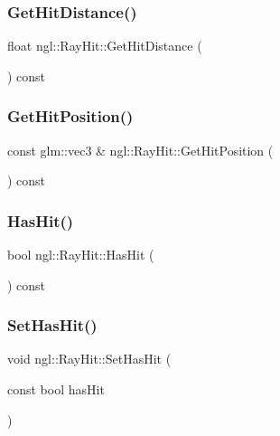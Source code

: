 \subsubsection{\texorpdfstring{Get\+Hit\+Distance()}{GetHitDistance()}}
{\footnotesize\ttfamily float ngl\+::\+Ray\+Hit\+::\+Get\+Hit\+Distance (\begin{DoxyParamCaption}{ }\end{DoxyParamCaption}) const}

\mbox{\label{classngl_1_1_ray_hit_a9e963f543bca4f205409ea9b416e01bc}} 
\subsubsection{\texorpdfstring{Get\+Hit\+Position()}{GetHitPosition()}}
{\footnotesize\ttfamily const glm\+::vec3 \& ngl\+::\+Ray\+Hit\+::\+Get\+Hit\+Position (\begin{DoxyParamCaption}{ }\end{DoxyParamCaption}) const}

\mbox{\label{classngl_1_1_ray_hit_a74b7f71e8610ea63941cff99e773961c}} 
\subsubsection{\texorpdfstring{Has\+Hit()}{HasHit()}}
{\footnotesize\ttfamily bool ngl\+::\+Ray\+Hit\+::\+Has\+Hit (\begin{DoxyParamCaption}{ }\end{DoxyParamCaption}) const}

\mbox{\label{classngl_1_1_ray_hit_a899a034da37fc875fea691505294f71d}} 
\subsubsection{\texorpdfstring{Set\+Has\+Hit()}{SetHasHit()}}
{\footnotesize\ttfamily void ngl\+::\+Ray\+Hit\+::\+Set\+Has\+Hit (\begin{DoxyParamCaption}\item[{const bool}]{has\+Hit }\end{DoxyParamCaption})}

